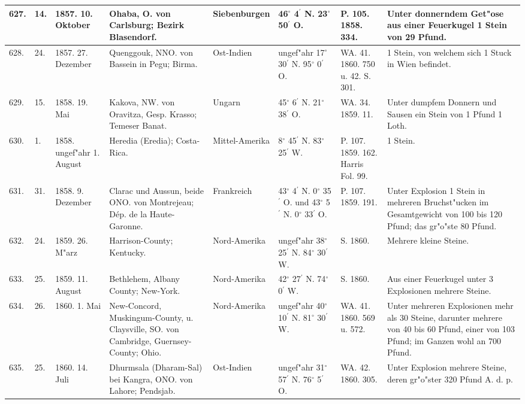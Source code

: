 \documentclass[a4paper, 8pt, oneside, polutonikogreek, german]{article}
\begin{document}
\begin{center}
\begin{longtable}{| p{5mm} | p{3mm} | p{15mm} | p{25mm} | p{20mm} | p{14mm} | p{17mm} | p{24mm} |}
        627. & 14. & 1857. 10. Oktober & Ohaba, O. von Carlsburg; Bezirk Blasendorf. & Siebenburgen & 46$^\circ$ 4$^\prime$ N. 23$^\circ$ 50$^\prime$ O. & P. 105. 1858. 334. & Unter donnerndem Get"ose aus einer Feuerkugel 1 Stein von 29 Pfund. \\ \hline
        628. & 24. & 1857. 27. Dezember & Quenggouk, NNO. von Bassein in Pegu; Birma. & Ost-Indien & ungef"ahr 17$^\circ$ 30$^\prime$ N. 95$^\circ$ 0$^\prime$ O. & WA. 41. 1860. 750 u. 42. S. 301. & 1 Stein, von welchem sich 1 Stuck in Wien befindet. \\ \hline
        629. & 15. & 1858. 19. Mai & Kakova, NW. von Oravitza, Gesp. Krasso; Temeser Banat. & Ungarn & 45$^\circ$ 6$^\prime$ N. 21$^\circ$ 38$^\prime$ O. & WA. 34. 1859. 11. & Unter dumpfem Donnern und Sausen ein Stein von 1 Pfund 1 Loth. \\ \hline
        630. & 1. & 1858. ungef"ahr 1. August & Heredia (Eredia); Costa-Rica. & Mittel-Amerika & 8$^\circ$ 45$^\prime$ N. 83$^\circ$ 25$^\prime$ W. & P. 107. 1859. 162. Harris Fol. 99. & 1 Stein. \\ \hline
        631. & 31. & 1858. 9. Dezember & Clarac und Aussun, beide ONO. von Montrejeau; Dép. de la Haute-Garonne. & Frankreich & 43$^\circ$ 4$^\prime$ N. 0$^\circ$ 35$^\prime$ O. und 43$^\circ$ 5$^\prime$ N. 0$^\circ$ 33$^\prime$ O. & P. 107. 1859. 191. & Unter Explosion 1 Stein in mehreren Bruchst"ucken im Gesamtgewicht von 100 bis 120 Pfund; das gr"o"ste 80 Pfund. \\ \hline
        632. & 24. & 1859. 26. M"arz & Harrison-County; Kentucky. & Nord-Amerika & ungef"ahr 38$^\circ$ 25$^\prime$ N. 84$^\circ$ 30$^\prime$ W. & S. 1860. & Mehrere kleine Steine. \\ \hline
        633. & 25. & 1859. 11. August & Bethlehem, Albany County; New-York. & Nord-Amerika & 42$^\circ$ 27$^\prime$ N. 74$^\circ$ 0$^\prime$ W. & S. 1860. & Aus einer Feuerkugel unter 3 Explosionen mehrere Steine. \\ \hline
        634. & 26. & 1860. 1. Mai & New-Concord, Muskingum-County, u. Claysville, SO. von Cambridge, Guernsey-County; Ohio. & Nord-Amerika & ungef"ahr 40$^\circ$ 10$^\prime$ N. 81$^\circ$ 30$^\prime$ W. & WA. 41. 1860. 569 u. 572. & Unter mehreren Explosionen mehr als 30 Steine, darunter mehrere von 40 bis 60 Pfund, einer von 103 Pfund; im Ganzen wohl an 700 Pfund. \\ \hline
        635. & 25. & 1860. 14. Juli & Dhurmsala (Dharam-Sal) bei Kangra, ONO. von Lahore; Pendsjab. & Ost-Indien & ungef"ahr 31$^\circ$ 57$^\prime$ N. 76$^\circ$ 5$^\prime$ O. & WA. 42. 1860. 305. & Unter Explosion mehrere Steine, deren gr"o"ster 320 Pfund A. d. p. \\ \hline

\end{longtable}
\end{center}
\end{document}
